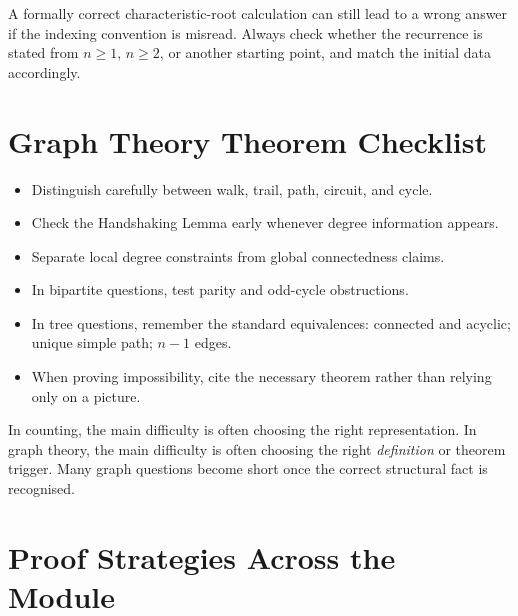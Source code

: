 \documentclass[12pt]{article}
\begin{document}
\begin{commonmistake}[title={Closed form without correct indexing}]
A formally correct characteristic-root calculation can still lead to a wrong answer if the indexing convention is misread. Always check whether the recurrence is stated from $n\ge 1$, $n\ge 2$, or another starting point, and match the initial data accordingly.
\end{commonmistake}

\section{Graph Theory Theorem Checklist}

\begin{itemize}[leftmargin=*]
    \item Distinguish carefully between walk, trail, path, circuit, and cycle.
    \item Check the Handshaking Lemma early whenever degree information appears.
    \item Separate local degree constraints from global connectedness claims.
    \item In bipartite questions, test parity and odd-cycle obstructions.
    \item In tree questions, remember the standard equivalences: connected and acyclic; unique simple path; $n-1$ edges.
    \item When proving impossibility, cite the necessary theorem rather than relying only on a picture.
\end{itemize}

\begin{extension}[title={Why graph theory revision feels different from counting revision}]
In counting, the main difficulty is often choosing the right representation. In graph theory, the main difficulty is often choosing the right \emph{definition} or theorem trigger. Many graph questions become short once the correct structural fact is recognised.
\end{extension}

\section{Proof Strategies Across the Module}
\end{document}
